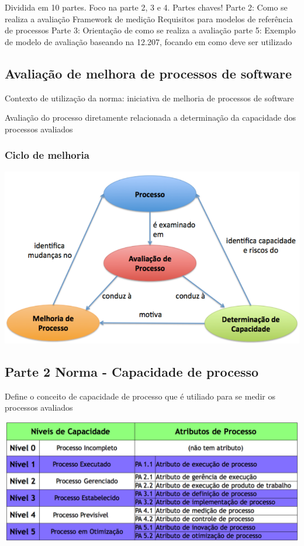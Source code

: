 \documentclass{article}
\begin{document}
	Dividida em 10 partes. 
	Foco na parte 2, 3 e 4. Partes chaves!
	Parte 2: 
		Como se realiza a avaliação
		Framework de medição
		Requisitos para modelos de referência de processos
	Parte 3:
		Orientação de como se realiza a avaliação
	parte 5:
		Exemplo de modelo de avaliação baseando na 12.207, focando em como deve ser utilizado
\subsection{Avaliação de melhora de processos de software}

	Contexto de utilização da norma: iniciativa de melhoria de processos de software
	
	Avaliação do processo diretamente relacionada a determinação da capacidade dos processos avaliados
	
	\subsubsection{Ciclo de melhoria}
	\begin{center}
		\includegraphics[scale=0.30]{ciclo_melhoria}	
	\end{center}			
		
\subsection{Parte 2 Norma - Capacidade de processo}
	Define o conceito de capacidade de processo que é utiliado para se medir os processos avaliados

	\begin{center}
		\includegraphics[scale=0.30]{capacidade_processo}
	\end{center}
	
\end{document}
